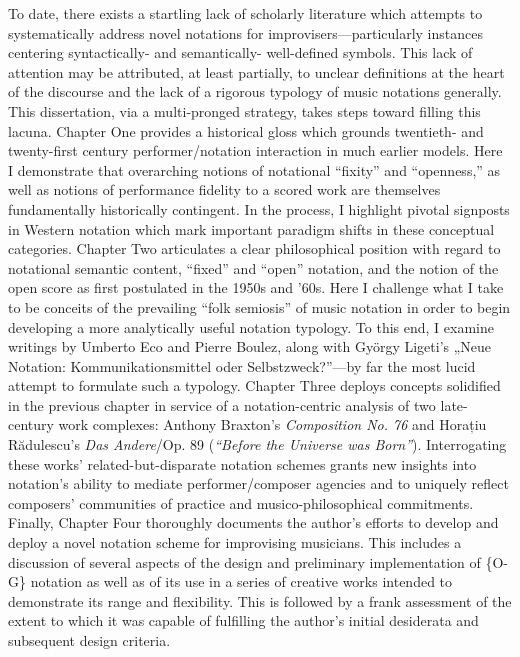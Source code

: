 {
To date, there exists a startling lack of scholarly literature which attempts to systematically address novel notations for improvisers---particularly instances centering syntactically- and semantically- well-defined symbols. This lack of attention may be attributed, at least partially, to unclear definitions at the heart of the discourse and the lack of a rigorous typology of music notations generally. This dissertation, via a multi-pronged strategy, takes steps toward filling this lacuna. Chapter One provides a historical gloss which grounds twentieth- and twenty-first century performer/notation interaction in much earlier models. Here I demonstrate that overarching notions of notational ``fixity'' and ``openness,'' as well as notions of performance fidelity to a scored work are themselves fundamentally historically contingent. In the process, I highlight pivotal signposts in Western notation which mark important paradigm shifts in these conceptual categories. Chapter Two articulates a clear philosophical position with regard to notational semantic content, ``fixed'' and ``open'' notation, and the notion of the open score as first postulated in the 1950s and '60s. Here I challenge what I take to be conceits of the prevailing ``folk semiosis'' of music notation in order to begin developing a more analytically useful notation typology. To this end, I examine writings by Umberto Eco and Pierre Boulez, along with Gy\"{o}rgy Ligeti's „Neue Notation: Kommunikationsmittel oder Selbstzweck?”---by far the most lucid attempt to formulate such a typology. Chapter Three deploys concepts solidified in the previous chapter in service of a notation-centric analysis of two late-century work complexes: Anthony Braxton's \textit{Composition No. 76} and Horațiu Rădulescu's \textit{Das Andere}/Op. 89 (\textit{``Before the Universe was Born''}). Interrogating these works' related-but-disparate notation schemes grants new insights into notation's ability to mediate performer/composer agencies and to uniquely reflect composers' communities of practice and musico-philosophical commitments. Finally, Chapter Four thoroughly documents the author's efforts to develop and deploy a novel notation scheme for improvising musicians. This includes a discussion of several aspects of the design and preliminary implementation of \{O-G\} notation as well as of its use in a series of creative works intended to demonstrate its range and flexibility. This is followed by a frank assessment of the extent to which it was capable of fulfilling the author's initial desiderata and subsequent design criteria.
}



